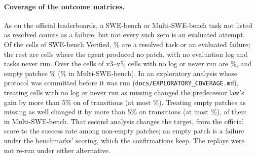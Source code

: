 \documentclass[11pt]{article}
\begin{document}
\paragraph{Coverage of the outcome matrices.} As on the official leaderboards, a SWE-bench or Multi-SWE-bench task not
listed as resolved counts as a failure, but not every such zero is an evaluated attempt. Of the \CovCellsThree{} cells
of SWE-bench Verified, \CovAttThree\% are a resolved task or an evaluated failure; the rest are \CovNoPatchThree{}
cells where the agent produced no patch, \CovNoLogThree{} with no evaluation log and \CovNotRunThree{} tasks never run.
Over the \CovCellsAll{} cells of v3--v5, cells with no log or never run are \CovMissAll\%, and empty patches
\CovNoPatchAll\% (\CovNoPatchMswe\% in Multi-SWE-bench). In an exploratory analysis whose protocol was committed before
it was run (\texttt{docs/EXPLORATORY\_COVERAGE.md}), treating cells with no log or never run as missing changed the
predecessor law's gain by more than 5\% on \CovBigOne{} of \CovNTrans{} transitions (at most \CovMaxOne\%). Treating
empty patches as missing as well changed it by more than 5\% on \CovBigTwo{} transitions (at most \CovMaxTwo\%),
\CovBigTwoMswe{} of them in Multi-SWE-bench. That second analysis changes the target, from the official score to the
success rate among non-empty patches; an empty patch is a failure under the benchmarks' scoring, which the
confirmations keep. The replays were not re-run under either alternative.
\end{document}
